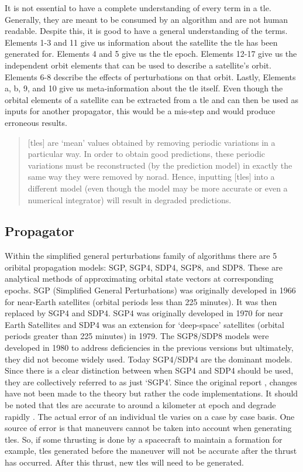 It is not essential to have a complete understanding of every term in a
\gls{tle}. Generally, they are meant to be consumed by an algorithm and are not
human readable. Despite this, it is good to have a general understanding of the
terms.  Elements 1-3 and 11 give us information about the satellite the
\gls{tle} has been generated for. Elements 4 and 5 give us the \gls{tle} epoch.
Elements 12-17 give us the independent orbit elements that can be used to
describe a satellite's orbit. Elements 6-8 describe the effects of
perturbations on that orbit. Lastly, Elements a, b, 9, and 10 give us
meta-information about the \gls{tle} itself. Even though the orbital elements
of a satellite can be extracted from a \gls{tle} and can then be used as inputs
for another propagator, this would be a mis-step and would produce erroneous
results. 

\begin{quote}
[\glspl{tle}] are `mean' values obtained by removing
periodic variations in a particular way. In order to obtain good predictions,
these periodic variations must be reconstructed (by the prediction model) in
exactly the same way they were removed by \gls{norad}. Hence, inputting
[\glspl{tle}] into a different model (even though the model may be more accurate or even
a numerical integrator) will result in degraded predictions. \cite{hoots_spacetrack_1980}
\end{quote}


\subsection{Propagator}

Within the simplified general perturbations family of algorithms there are 5
oribital propagation models: SGP, SGP4, SDP4, SGP8, and SDP8. These are
analytical methods of approximating orbital state vectors at corresponding
epochs. SGP (Simplified General Perturbations) was originally developed in 1966 for near-Earth satellites (orbital
periods less than 225 minutes). It was then replaced by SGP4 and SDP4.  SGP4
was originally developed in 1970 for near Earth Satellites and SDP4 was an
extension for `deep-space' satellites (orbital periods greater than 225
minutes) in 1979.  The SGP8/SDP8 models were developed in 1980 to address
deficiencies in the previous versions but ultimately, they did not become
widely used.  Today SGP4/SDP4 are the dominant models.  Since there is a clear
distinction between when SGP4 and SDP4 should be used, they are collectively
referred to as just `SGP4'. Since the original report
\cite{hoots_spacetrack_1980}, changes have not been made to the theory but
rather the code implementations.  It should be noted that \glspl{tle} are
accurate to around a kilometer at epoch and degrade rapidly
\cite{vallado_revisiting_2006}. The actual error of an individual \gls{tle}
varies on a case by case basis. One source of error is that maneuvers cannot be
taken into account when generating \glspl{tle}. So, if some thrusting is done
by a spacecraft to maintain a formation for example, \glspl{tle} generated
before the maneuver will not be accurate after the thrust has occurred. After
this thrust, new \glspl{tle} will need to be generated. 



